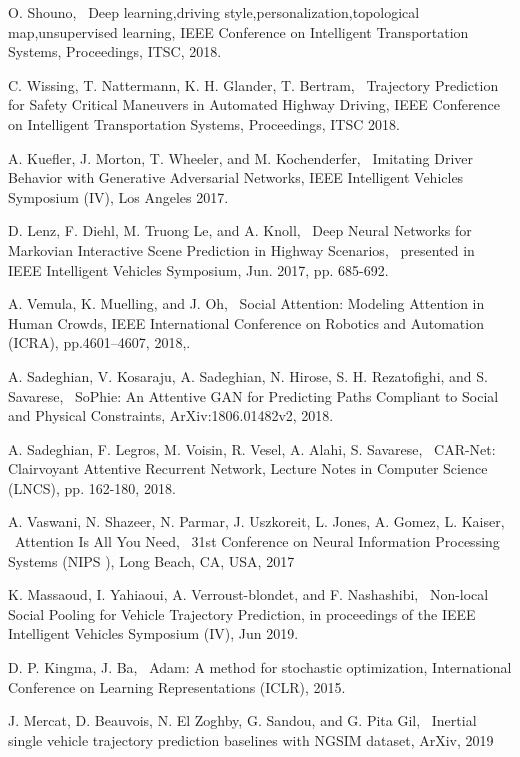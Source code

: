 \documentclass[a4paper, 10pt, conference]{ieeeconf}      %
\begin{document}
\begin{thebibliography}{99}
 O. Shouno, ~Deep learning,driving style,personalization,topological map,unsupervised learning,
IEEE Conference on Intelligent Transportation Systems, Proceedings, ITSC, 2018.

 C. Wissing, T. Nattermann, K. H. Glander, T. Bertram,
~Trajectory Prediction for Safety Critical Maneuvers in Automated Highway Driving,
IEEE Conference on Intelligent Transportation Systems, Proceedings, ITSC 2018.

 A. Kuefler, J. Morton, T. Wheeler, and M. Kochenderfer, ~Imitating Driver Behavior with Generative Adversarial Networks,
IEEE Intelligent Vehicles Symposium (IV), Los Angeles 2017.

 D. Lenz, F. Diehl, M. Truong Le, and A. Knoll, ~Deep Neural Networks for Markovian Interactive Scene Prediction in Highway Scenarios,
~presented in IEEE Intelligent Vehicles Symposium, Jun. 2017, pp. 685-692.

  A. Vemula, K. Muelling, and J. Oh, ~Social Attention: Modeling Attention in Human Crowds,
IEEE International Conference on Robotics and Automation (ICRA), pp.4601--4607, 2018,.

 A. Sadeghian, V. Kosaraju, A. Sadeghian, N. Hirose, S. H. Rezatofighi, and S. Savarese,
~SoPhie: An Attentive GAN for Predicting Paths Compliant to Social and Physical Constraints,
ArXiv:1806.01482v2, 2018.

 A. Sadeghian, F. Legros, M. Voisin, R. Vesel, A. Alahi, S. Savarese,
~CAR-Net: Clairvoyant Attentive Recurrent Network, Lecture Notes in Computer Science (LNCS), pp. 162-180, 2018.

 A. Vaswani, N. Shazeer, N. Parmar, J. Uszkoreit, L. Jones, A. Gomez, L. Kaiser, ~Attention Is All You Need,
~31st Conference on Neural Information Processing Systems (NIPS ), Long Beach, CA, USA, 2017


 K. Massaoud, I. Yahiaoui, A. Verroust-blondet, and F. Nashashibi, ~Non-local Social Pooling for Vehicle Trajectory Prediction,
in proceedings of the IEEE Intelligent Vehicles Symposium (IV), Jun 2019.

 D. P. Kingma, J. Ba, ~Adam: A method for stochastic optimization,
International Conference on Learning Representations (ICLR), 2015.


     J. Mercat, D. Beauvois, N. El Zoghby, G. Sandou, and G. Pita Gil,
~Inertial single vehicle trajectory prediction baselines with NGSIM dataset,
ArXiv, 2019



\end{thebibliography}
\end{document}

